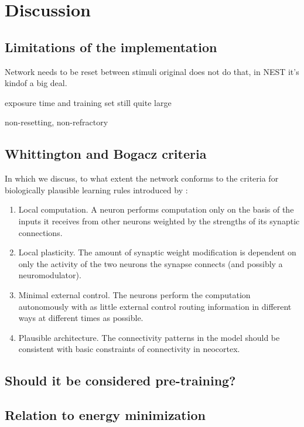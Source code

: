 
\chapter{Discussion}


\section{Limitations of the implementation}

Network needs to be reset between stimuli
original does not do that, in NEST it's kindof a big deal.

exposure time and training set still quite large

non-resetting, non-refractory


\section{Whittington and Bogacz criteria}

In which we discuss, to what extent the network conforms to the criteria for biologically plausible learning rules
introduced by \cite{Whittington2017}:
\begin{enumerate}
    \item Local computation. A neuron performs computation only on the basis
          of the inputs it receives from other neurons weighted by the strengths
          of its synaptic connections.
    \item  Local plasticity. The amount of synaptic weight modification is dependent on only the activity of the two
          neurons the synapse connects (and possibly a neuromodulator).
    \item  Minimal external control. The neurons perform the computation autonomously with as little external control
          routing information in different ways at different times as possible.
    \item   Plausible architecture. The connectivity patterns in the model should
          be consistent with basic constraints of connectivity in neocortex.
\end{enumerate}

\section{Should it be considered pre-training?}


\section{Relation to energy minimization}


